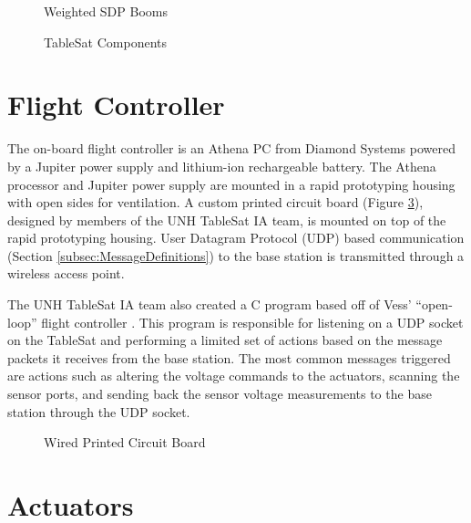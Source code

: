 \begin{figure}[H]
  \centerline{}
  \caption{Weighted SDP Booms \cite{laakso}}
  \label{fig:WeightedSDPBooms}
\end{figure}


\begin{figure}[H]
\centerline{}
\caption{TableSat Components}
\label{fig:TSatComponents}
\end{figure}

\section{Flight Controller}
\label{sec:FlightController}

The on-board flight controller is an Athena PC from Diamond Systems powered by a Jupiter power supply and lithium-ion rechargeable battery.  The Athena processor and Jupiter power supply are mounted in a rapid prototyping housing with open sides for ventilation.  A custom printed circuit board (Figure \ref{fig:WiredPCB}), designed by members of the UNH TableSat IA team, is mounted on top of the rapid prototyping housing.  User Datagram Protocol (UDP) based communication (Section \ref{subsec:MessageDefinitions}) to the base station is transmitted through a wireless access point.

The UNH TableSat IA team also created a C program based off of Vess' ``open-loop'' flight controller \cite{vessthesis} .  This program is responsible for listening on a UDP socket on the TableSat and performing a limited set of actions based on the message packets it receives from the base station.  The most common messages triggered are actions such as altering the voltage commands to the actuators, scanning the sensor ports, and sending back the sensor voltage measurements to the base station through the UDP socket.

\begin{figure}[ht]
  \centerline{}
  \caption{Wired Printed Circuit Board}
  \label{fig:WiredPCB}
\end{figure}


\section{Actuators}
\label{sec:Actuators}


